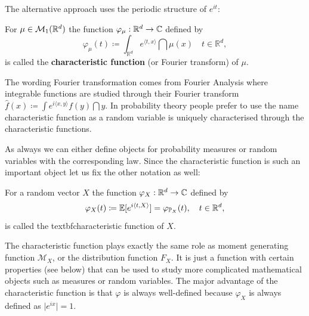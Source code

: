 The alternative approach uses the periodic structure of $e^{it}$:
\begin{ldef}
\begin{deff}

			For $\mu \in \mathcal{M}_1(\mathbb{R}^d)$ the function $\varphi_\mu:\mathbb{R}^d\to\mathbb{C}$ defined by $$\varphi_{\mu}(t) \coloneqq \int_{\mathbb{R}^d} e^{\langle t,x \rangle} \dint\mu (x) \quad t\in \mathbb{R}^d,$$ is called the \textbf{characteristic function} (or Fourier transform) of $\mu$.
\end{deff}
\end{ldef}
The wording Fourier transformation comes from Fourier Analysis where integrable functions are studied through their Fourier transform $\hat{f}(x) \coloneqq \int e^{i\langle x, y \rangle} f(y) \dint y$. In probability theory people prefer to use the name characteristic function as a random variable is uniquely characterised through the characteristic functions.\smallskip

As always we can either define objects for probability measures or random variables with the corresponding law. Since the characteristic function is such an important object let us fix the other notation as well:
\begin{ldef}
\begin{deff}
			For a random vector $X$ the function $\varphi_X:\mathbb{R}^d\to\mathbb{C}$ defined by $$\varphi_X(t) \coloneqq \mathbb{E}[e^{i \langle t, X \rangle}] = \varphi_{\mathbb{P}_X}(t), \quad t\in \mathbb{R}^d,$$ is called the textbf{characteristic function of $X$}.
\end{deff}
\end{ldef}
			 The characteristic function plays exactly the same role as moment generating function $\mathcal M_X$, or the distribution function $F_X$. It is just a function with certain properties (see below) that can be used to study more complicated mathematical objects such as measures or random variables. The major advantage of the characteristic function is that $\varphi$ is always well-defined because $\varphi_X$ is always defined as $\lvert e^{ix} \rvert = 1$.\smallskip


